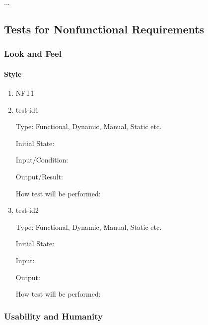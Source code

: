 \documentclass[12pt, titlepage]{article}
\begin{document}
...

\subsection{Tests for Nonfunctional Requirements}

\subsubsection{Look and Feel}
\paragraph{Style}
\begin{enumerate}
    \item{NFT1}

\item{test-id1\\}

Type: Functional, Dynamic, Manual, Static etc.
					
Initial State: 
					
Input/Condition: 
					
Output/Result: 
					
How test will be performed: 
					
\item{test-id2\\}

Type: Functional, Dynamic, Manual, Static etc.
					
Initial State: 
					
Input: 
					
Output: 
					
How test will be performed: 

\end{enumerate}

\subsubsection{Usability and Humanity}
\end{document}
